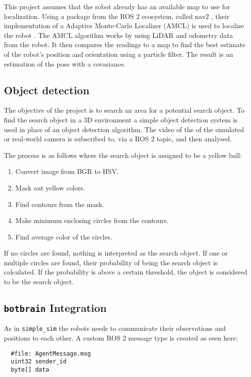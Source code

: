 This project assumes that the robot already has an available map to use for localization. 
Using a package from the ROS 2 ecosystem, called nav2 \cite{nav2}, their implementation of a Adaptive Monte-Carlo Localizer (AMCL) is used to localize the robot \cite{amcl}.
The AMCL algorithm works by using LiDAR and odometry data from the robot. It then compares the readings to a map to find the best estimate of the robot's position and orientation using a particle filter. The result is an estimation of the pose with a covariance.

\subsection{Object detection}\label{sub:object_detection}
The objective of the project is to search an area for a potential search object.
To find the search object in a 3D environment a simple object detection system is used in place of an object detection algorithm. The video of the of the simulated or real-world camera is subscribed to, via a ROS 2 topic, and then analysed. 

The process is as follows where the search object is assigned to be a yellow ball:
\begin{enumerate}
  \item Convert image from BGR to HSV.
  \item Mask out yellow colors. 
  \item Find contours from the mask.
  \item Make minimum enclosing circles from the contours.
  \item Find average color of the circles.
\end{enumerate}

If no circles are found, nothing is interpreted as the search object. If one or multiple circles are found, their probability of being the search object is calculated.
If the probability is above a certain threshold, the object is considered to be the search object.

\subsection{\texttt{botbrain} Integration}\label{sub:Botbrain_integration}
As in \texttt{simple\_sim} the robots needs to communicate their observations and positions to each other. A custom ROS 2 message type is created as seen here:
\begin{verbatim}
  #file: AgentMessage.msg
  uint32 sender_id
  byte[] data
\end{verbatim}

